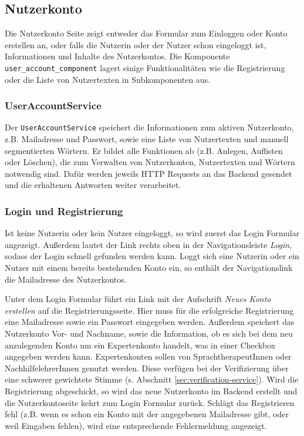 \subsection{Nutzerkonto}
\label{sec:nutzerkonto}

Die Nutzerkonto Seite zeigt entweder das Formular zum Einloggen oder Konto erstellen an, oder falls die Nutzerin oder der Nutzer schon eingeloggt ist, Informationen und Inhalte des Nutzerkontos. Die Komponente \texttt{user\_account\_component} lagert einige Funktionalitäten wie die Registrierung oder die Liste von Nutzertexten in Subkomponenten aus.

\subsubsection{UserAccountService}

Der \texttt{UserAccountService} speichert die Informationen zum aktiven Nutzerkonto, z.B. Mailadresse und Passwort, sowie eine Liste von Nutzertexten und manuell segmentierten Wörtern. Er bildet alle Funktionen ab (z.B. Anlegen, Auflisten oder Löschen), die zum Verwalten von Nutzerkonten, Nutzertexten und Wörtern notwendig sind. Dafür werden jeweils HTTP Requests an das Backend gesendet und die erhaltenen Antworten weiter verarbeitet.

\subsubsection{Login und Registrierung}

Ist keine Nutzerin oder kein Nutzer eingeloggt, so wird zuerst das Login Formular angezeigt. Außerdem lautet der Link rechts oben in der Navigationsleiste \textit{Login}, sodass der Login schnell gefunden werden kann. Loggt sich eine Nutzerin oder ein Nutzer mit einem bereits bestehenden Konto ein, so enthält der Navigationslink die Mailadresse des Nutzerkontos.

Unter dem Login Formular führt ein Link mit der Aufschrift \textit{Neues Konto erstellen} auf die Registrierungsseite. Hier muss für die erfolgreiche Registrierung eine Mailadresse sowie ein Passwort eingegeben werden. Außerdem speichert das Nutzerkonto Vor- und Nachname, sowie die Information, ob es sich bei dem neu anzulegenden Konto um ein Expertenkonto handelt, was in einer Checkbox angegeben werden kann. Expertenkonten sollen von SprachtherapeutInnen oder NachhilfelehrerInnen genutzt werden.  Diese verfügen bei der Verifizierung über eine schwerer gewichtete Stimme (s. Abschnitt \ref{sec:verification-service}). Wird die Registrierung abgeschickt, so wird das neue Nutzerkonto im Backend erstellt und die Nutzerkontoseite kehrt zum Login Formular zurück. Schlägt das Registrieren fehl (z.B. wenn es schon ein Konto mit der angegebenen Mailadresse gibt, oder weil Eingaben fehlen), wird eine entsprechende Fehlermeldung angezeigt.

